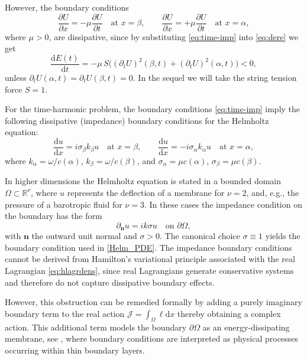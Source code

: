 \documentclass[twoside,11pt]{article}
\def\dimx{\nu }
\def\d{{\mathrm d}}
\begin{document}
{However, the boundary conditions
\begin{equation}\label{eq:time-imp}
\frac{\partial U}{\partial x}=-\mu \frac{\partial U}{\partial t}\quad \text{at } x=\beta,
\qquad
\frac{\partial U}{\partial x}=+\mu \frac{\partial U}{\partial t}\quad \text{at } x=\alpha,
\end{equation}
where $\mu>0$,
are dissipative, since   by substituting \eqref{eq:time-imp} into \eqref{eq:dere} we get
\[
 {\frac{\d E(t)}{\d t} = -\mu\, S\bigl((\partial_t U)^2(\beta,t)+(\partial_t U)^2(\alpha,t)\bigr)< 0,}
\]
 {unless $\partial_t U(\alpha,t)=\partial_t U(\beta,t)=0$.}
In the sequel we will  take the string tension force $S=1$.


For the time-harmonic problem, the boundary conditions \eqref{eq:time-imp} imply the following dissipative (impedance)  boundary conditions for the Helmholtz equation:
\begin{equation}\label{eq:time-harm-imp}
\frac{\d u}{\d x}= i \sigma_{\beta} k_{\beta} u \quad \text{at } x=\beta,
\qquad
\frac{\d u}{\d x}= - i \sigma_{\alpha} k_{\alpha} u \quad \text{at } x=\alpha,
\end{equation}
where $k_{\alpha}=\omega/c(\alpha)$, $k_{\beta}=\omega/c(\beta)$, and $\sigma_{\alpha}=\mu c(\alpha)$, $\sigma_{\beta}=\mu c(\beta)$.

  {In higher dimensions the Helmholtz equation is stated in a bounded domain  
$\Omega\subset\mathbb{R}^{\dimx}$, where $u$ represents the deflection of a membrane for ${\dimx}=2$, and, e.g., the pressure of a barotropic fluid for ${\dimx}=3$.   In these cases the impedance condition on the boundary has the form
\[
 {\partial_{\mathbf{n}} u} = i k \sigma u \quad \text{on } \partial\Omega,
\]
 with $\mathbf{n}$ the outward unit normal and $\sigma>0$. The canonical choice $\sigma\equiv 1$ yields the boundary condition used in \eqref{Helm_PDE}.
 The impedance boundary conditions cannot be derived from Hamilton's variational principle associated with the real Lagrangian \eqref{eq:hlagrdens}, since real Lagrangians generate conservative systems and therefore do not capture dissipative boundary effects.
}





 {However, this obstruction can be remedied formally by adding a purely imaginary boundary term to the real action
$\mathcal{J}=\int_{\Omega} \ell \d x$
thereby obtaining a complex action. This additional term models the boundary $\partial\Omega$ as an energy-dissipating membrane, see \cite{FR2015}, where boundary conditions are interpreted as physical processes occurring within thin boundary layers.}

}
\end{document}
